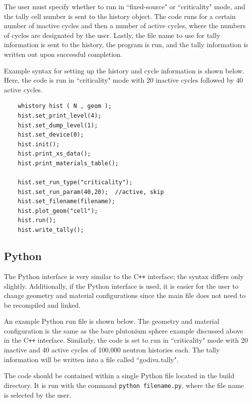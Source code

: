 \documentclass[twoside,a4paper]{refart}
\begin{document}
The user must specify whether to run in ``fixed-source" or ``criticality" mode, and the tally cell number
is sent to the history object. The code runs for a certain number of inactive cycles and then a number of
active cycles, where the numbers of cycles are designated by the user. Lastly, the file name to use for
tally information is sent to the history, the program is run, and the tally information is written out
upon successful completion.

Example syntax for setting up the history and cycle information is shown below. Here, the code is run in
``criticality" mode with 20 inactive cycles followed by 40 active cycles.

\begin{verbatim}
	whistory hist ( N , geom );
	hist.set_print_level(4);
	hist.set_dump_level(1);
	hist.set_device(0);
	hist.init();
	hist.print_xs_data();
	hist.print_materials_table();

	hist.set_run_type("criticality");
	hist.set_run_param(40,20);  //active, skip
	hist.set_filename(filename);
	hist.plot_geom("cell"); 
	hist.run();
	hist.write_tally();
\end{verbatim}

\subsection{Python}

The Python interface is very similar to the C\texttt{++} interface; the syntax differs only slightly.
Additionally, if the Python interface is used, it is easier for the user to change geometry and material 
configurations since the main file does not need to be recompiled and linked.

An example Python run file is shown below. The geometry and material configuration is the same as the
bare plutonium sphere example discussed above in the C\texttt{++} interface. Similarly, the code is set
to run in ``criticality" mode with 20 inactive and 40 active cycles of 100,000 neutron histories each.
The tally information will be written into a file called ``godiva.tally".

The code should be contained within a single Python file located in the build directory. It is run with
the command \texttt{python filename.py}, where the file name is selected by the user.
\end{document}
